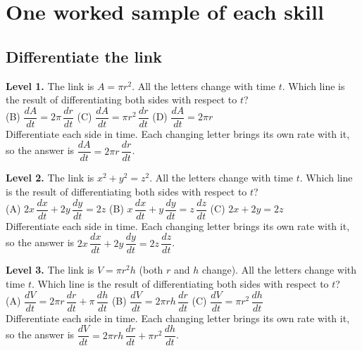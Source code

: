\documentclass[11pt]{article}
\begin{document}
\section*{One worked sample of each skill}
\subsection*{Differentiate the link}
\noindent\textbf{Level 1.} The link is $A=\pi r^2$. All the letters change with time $t$. Which line is the result of differentiating both sides with respect to $t$?\\  \quad (B) $\dfrac{dA}{dt}=2\pi\,\dfrac{dr}{dt}$ \quad (C) $\dfrac{dA}{dt}=\pi r^2\,\dfrac{dr}{dt}$ \quad (D) $\dfrac{dA}{dt}=2\pi r$\\  \quad Differentiate each side in time. Each changing letter brings its own rate with it, so the answer is $\dfrac{dA}{dt}=2\pi r\,\dfrac{dr}{dt}$.\par\medskip
\noindent\textbf{Level 2.} The link is $x^2+y^2=z^2$. All the letters change with time $t$. Which line is the result of differentiating both sides with respect to $t$?\\ (A) $2x\,\dfrac{dx}{dt}+2y\,\dfrac{dy}{dt}=2z$ \quad (B) $x\,\dfrac{dx}{dt}+y\,\dfrac{dy}{dt}=z\,\dfrac{dz}{dt}$ \quad (C) $2x+2y=2z$ \quad {}\\  \quad Differentiate each side in time. Each changing letter brings its own rate with it, so the answer is $2x\,\dfrac{dx}{dt}+2y\,\dfrac{dy}{dt}=2z\,\dfrac{dz}{dt}$.\par\medskip
\noindent\textbf{Level 3.} The link is $V=\pi r^2h$ (both $r$ and $h$ change). All the letters change with time $t$. Which line is the result of differentiating both sides with respect to $t$?\\ (A) $\dfrac{dV}{dt}=2\pi r\,\dfrac{dr}{dt}+\pi\,\dfrac{dh}{dt}$ \quad (B) $\dfrac{dV}{dt}=2\pi rh\,\dfrac{dr}{dt}$ \quad (C) $\dfrac{dV}{dt}=\pi r^2\,\dfrac{dh}{dt}$ \quad {}\\  \quad Differentiate each side in time. Each changing letter brings its own rate with it, so the answer is $\dfrac{dV}{dt}=2\pi rh\,\dfrac{dr}{dt}+\pi r^2\,\dfrac{dh}{dt}$.\par\medskip
\end{document}
